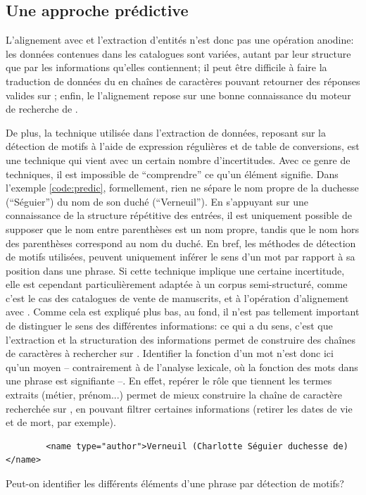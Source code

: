 \subsection{Une approche prédictive}
L'alignement avec \wkd{} et l'extraction d'entités n'est donc pas une opération anodine: les données contenues dans les catalogues sont variées, autant par leur structure que par les informations qu'elles contiennent; il peut être difficile à faire la traduction de données du  en chaînes de caractères pouvant retourner des réponses valides sur \wkd{}; enfin, le l'alignement repose sur une bonne connaissance du moteur de recherche de \wkd{}. 

De plus, la technique utilisée dans l'extraction de données, reposant sur la détection de motifs à l'aide de \glspl{expression régulière} et de \glspl{table de conversion}, est une technique qui vient avec un certain nombre d'incertitudes. Avec ce genre de techniques, il est impossible de \enquote{comprendre} ce qu'un élément signifie. Dans l'exemple \ref{code:predic}, formellement, rien ne sépare le nom propre de la duchesse (\enquote{Séguier}) du nom de son duché (\enquote{Verneuil}). En s'appuyant sur une connaissance de la structure répétitive des entrées, il est uniquement possible de supposer que le nom entre parenthèses est un nom propre, tandis que le nom hors des parenthèses correspond au nom du duché. En bref, les méthodes de détection de motifs utilisées, peuvent uniquement inférer le sens d'un mot par rapport à sa position dans une phrase. Si cette technique implique une certaine incertitude, elle est cependant particulièrement adaptée à un corpus semi-structuré, comme c'est le cas des catalogues de vente de manuscrits, et à l'opération d'alignement avec \wkd{}. Comme cela est expliqué plus bas, au fond, il n'est pas tellement important de distinguer le sens des différentes informations: ce qui a du sens, c'est que l'extraction et la structuration des informations permet de construire des chaînes de caractères à rechercher sur \wkd{}. Identifier la fonction d'un mot n'est donc ici qu'un moyen -- contrairement à de l'analyse lexicale, où la fonction des mots dans une phrase est signifiante --. En effet, repérer le rôle que tiennent les termes extraits (métier, prénom...) permet de mieux construire la chaîne de caractère recherchée sur \wkd{}, en pouvant filtrer certaines informations (retirer les dates de vie et de mort, par exemple).

\begin{listing}
	\begin{verbatim}
		<name type="author">Verneuil (Charlotte Séguier duchesse de)</name>
	\end{verbatim}
	\caption{Peut-on identifier les différents éléments d'une phrase par détection de motifs?}
	\label{code:predic}
\end{listing}

